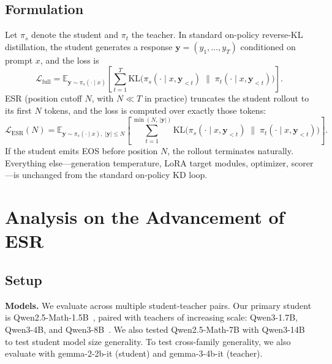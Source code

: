 \documentclass{article}
\newcommand{\Method}{ESR}
\newcommand{\KL}{\mathrm{KL}}
\begin{document}
\subsection{Formulation}

Let $\pi_s$ denote the student and $\pi_t$ the teacher. In standard on-policy reverse-KL distillation, the student generates a response $\mathbf{y} = (y_1, \ldots, y_T)$ conditioned on prompt $x$, and the loss is
\begin{equation}
\mathcal{L}_{\text{full}} = \mathbb{E}_{\mathbf{y} \sim \pi_s(\cdot \mid x)} \!\left[ \sum_{t=1}^{T} \KL\!\bigl(\pi_s(\cdot \mid x, \mathbf{y}_{<t}) \;\|\; \pi_t(\cdot \mid x, \mathbf{y}_{<t})\bigr) \right].
\label{eq:full_loss}
\end{equation}
\Method{} (position cutoff $N$, with $N \ll T$ in practice) truncates the student rollout to its first $N$ tokens, and the loss is computed over exactly those tokens:
\begin{equation}
\mathcal{L}_{\text{ESR}}(N) = \mathbb{E}_{\mathbf{y} \sim \pi_s(\cdot \mid x),\;|\mathbf{y}|\le N} \!\left[ \sum_{t=1}^{\min(N,\,|\mathbf{y}|)} \KL\!\bigl(\pi_s(\cdot \mid x, \mathbf{y}_{<t}) \;\|\; \pi_t(\cdot \mid x, \mathbf{y}_{<t})\bigr) \right].
\label{eq:esr_loss}
\end{equation}
If the student emits EOS before position $N$, the rollout terminates naturally. Everything else---generation temperature, LoRA target modules, optimizer, scorer---is unchanged from the standard on-policy KD loop.


\section{Analysis on the Advancement of \Method{}}
\label{sec:experiments}
\subsection{Setup}

\textbf{Models.} We evaluate across multiple student-teacher pairs. Our primary student is Qwen2.5-Math-1.5B~\citep{qwen2024qwen25math}, paired with teachers of increasing scale: Qwen3-1.7B, Qwen3-4B, and Qwen3-8B~\citep{qwen2025qwen3}. We also tested Qwen2.5-Math-7B with Qwen3-14B to test student model size generality. To test cross-family generality, we also evaluate with gemma-2-2b-it (student) and gemma-3-4b-it (teacher).
\end{document}
